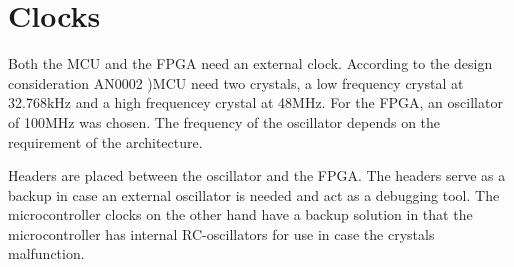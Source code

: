 \documentclass[../main/report.tex]{subfiles}
\begin{document}
\section{Clocks}
Both the MCU and the FPGA need an external clock.
According to the design consideration AN0002 \cite{efm32gg design consideration})MCU need two crystals, a low frequency crystal at 32.768kHz and a high frequencey crystal at 48MHz. 
For the FPGA, an oscillator of 100MHz was chosen. The frequency of the oscillator depends on the requirement of the architecture.

Headers are placed between the oscillator and the FPGA. 
The headers serve as a backup in case an external oscillator is needed and act as a debugging tool.
The microcontroller clocks on the other hand have a backup solution in that the microcontroller has internal RC-oscillators for use in case the crystals malfunction.
\end{document}
